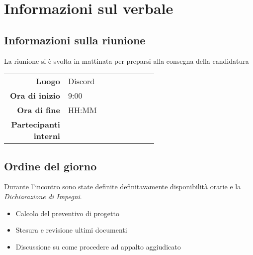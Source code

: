 \section{Informazioni sul verbale}

\subsection{Informazioni sulla riunione}
La riunione si è svolta in mattinata per preparsi alla consegna della candidatura

\begin{center}
	\begin{tabular}{r|p{0.6\linewidth}}
		\toprule
		\textbf{Luogo} & Discord \\
		\textbf{Ora di inizio} & 9:00 \\
		\textbf{Ora di fine} & HH:MM \\
		\textbf{Partecipanti interni} & \groupTeam
	\end{tabular}
\end{center}

\medskip

\subsection{Ordine del giorno}
Durante l'incontro sono state definite definitavamente disponibilità orarie e la \textit{Dichiarazione di Impegni}.
\begin{itemize}
	\item Calcolo del preventivo di progetto
	\item Stesura e revisione ultimi documenti
	\item Discussione su come procedere ad appalto aggiudicato
\end{itemize}
